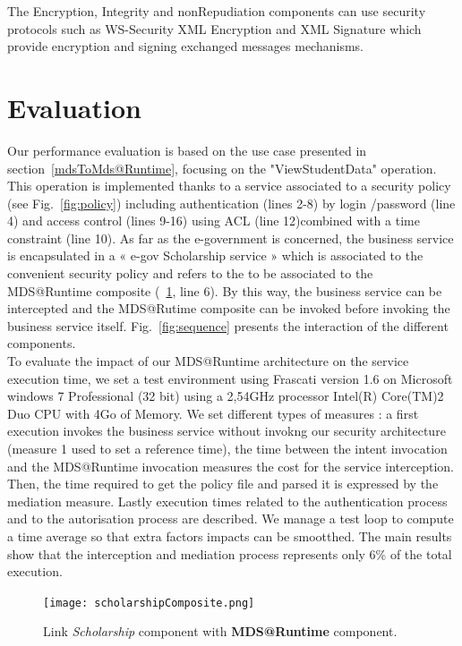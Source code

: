\documentclass[runningheads,a4paper]{llncs}
\begin{document}
The Encryption, Integrity and nonRepudiation components can use security protocols such as WS-Security XML Encryption and XML Signature which provide encryption and signing  exchanged messages mechanisms.


\section{Evaluation}

\label{sec:evaluation}


 Our performance evaluation is based on the use case presented in section~\ref{mdsToMds@Runtime}, focusing on the "ViewStudentData" operation. This operation is implemented thanks to a service associated to a security policy (see Fig.~\ref{fig:policy}) including authentication (lines 2-8) by login /password (line 4) and access control (lines 9-16) using ACL (line 12)combined with a time constraint (line 10). As far as the e-government is concerned, the business service is encapsulated in a « e-gov Scholarship service » which is associated to the convenient security policy and refers to the to be associated to the MDS@Runtime composite (~\ref{fig:gestionEtudiant}, line 6). By this way, the business service can be intercepted and the MDS@Rutime composite can be invoked before invoking the business service itself.
Fig.~\ref{fig:sequence} presents the interaction of the different components.
\\To evaluate the impact of our MDS@Runtime architecture on the service execution time, we set a test environment using Frascati version 1.6 on Microsoft windows 7 Professional (32 bit) using a 2,54GHz processor Intel(R) Core(TM)2 Duo CPU with 4Go of Memory.
We set different types of measures : a first execution invokes the business service without invokng our security architecture (measure 1 used to set a reference time), the time between the intent invocation and the MDS@Runtime invocation measures the cost for the service interception. Then, the time required to get the policy file and parsed it is expressed by the mediation measure. Lastly execution times related to the authentication process and to the autorisation process are described.
We manage a test loop to compute a time average so that extra factors impacts can be  smootthed.
The main results show that the interception and mediation process represents only 6\% of the total execution. 

\begin{figure}  
\center
\texttt{[image: scholarshipComposite.png]}
\caption{Link \emph{Scholarship} component with \textbf{MDS@Runtime} component.}
\label{fig:gestionEtudiant}
\end{figure}
\end{document}
